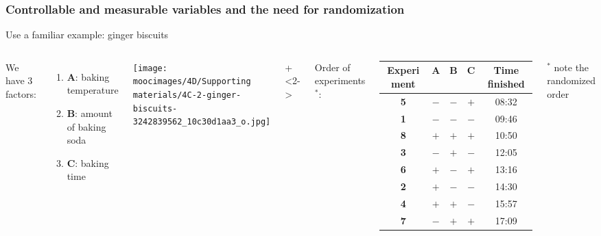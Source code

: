 \documentclass[handout,11pt,aspectratio=169,mathserif]{beamer}
\begin{document}
\begin{frame}\frametitle{Controllable and measurable variables and the need for randomization}
	Use a familiar example: {\color{myOrange} ginger biscuits}
	\vspace{0.25cm}
	\begin{columns}[T]
			We have 3 factors:
			\begin{enumerate}
				\item	\textbf{A}: baking temperature
				\item	\textbf{B}: amount of baking soda
				\item	\textbf{C}: baking time
			\end{enumerate}
			
			
			\vspace{1cm}
			
			\texttt{[image: \\moocimages/4D/Supporting materials/4C-2-ginger-biscuits-3242839562\_10c30d1aa3\_o.jpg]}
		
		
			
		
		
			\onslide+<2->{
			
				Order of experiments$^\ast$:
			
				\begin{tabulary}{\linewidth}{ccccc}\hline 
					\textbf{\relax Experiment } & \textbf{\relax A } & \textbf{\relax B } & \textbf{\relax C } & \textbf{\relax Time finished} \\
					\hline 
					\textbf{5} & \(-\) & \(-\) & \(+\) & 08:32\\
					\textbf{1} & \(-\) & \(-\) & \(-\) & 09:46\\
					\textbf{8} & \(+\) & \(+\) & \(+\) & 10:50\\
					\textbf{3} & \(-\) & \(+\) & \(-\) & 12:05\\
					\textbf{6} & \(+\) & \(-\) & \(+\) & 13:16\\
					\textbf{2} & \(+\) & \(-\) & \(-\) & 14:30\\
					\textbf{4} & \(+\) & \(+\) & \(-\) & 15:57\\
					\textbf{7} & \(-\) & \(+\) & \(+\) & 17:09\\
					
					 \hline
				\end{tabulary}
				
				\vspace{0.2cm}
				{\scriptsize $^\ast$ note the randomized order}
			}
			
			\vspace{0.75cm}
	\end{columns}	
\end{frame}
\end{document}
